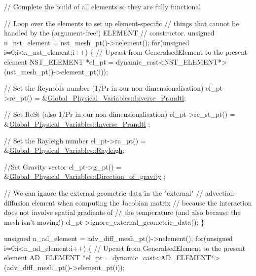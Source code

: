 \begin{DoxyCodeInclude}
 \textcolor{comment}{// Complete the build of all elements so they are fully functional }

 \textcolor{comment}{// Loop over the elements to set up element-specific }
 \textcolor{comment}{// things that cannot be handled by the (argument-free!) ELEMENT }
 \textcolor{comment}{// constructor.}
 \textcolor{keywordtype}{unsigned} n\_nst\_element = nst\_mesh\_pt()->nelement();
 \textcolor{keywordflow}{for}(\textcolor{keywordtype}{unsigned} i=0;i<n\_nst\_element;i++)
  \{
   \textcolor{comment}{// Upcast from GeneralsedElement to the present element}
   NST\_ELEMENT *el\_pt = \textcolor{keyword}{dynamic\_cast<}NST\_ELEMENT*\textcolor{keyword}{>}
    (nst\_mesh\_pt()->element\_pt(i));

   \textcolor{comment}{// Set the Reynolds number (1/Pr in our non-dimensionalisation)}
   el\_pt->re\_pt() = &\hyperlink{namespaceGlobal__Physical__Variables_a87796c9f402e6f90c07cf5ba0db4367e}{Global\_Physical\_Variables::Inverse\_Prandtl};

   \textcolor{comment}{// Set ReSt (also 1/Pr in our non-dimensionalisation)}
   el\_pt->re\_st\_pt() = &\hyperlink{namespaceGlobal__Physical__Variables_a87796c9f402e6f90c07cf5ba0db4367e}{Global\_Physical\_Variables::Inverse\_Prandtl}
      ;

   \textcolor{comment}{// Set the Rayleigh number}
   el\_pt->ra\_pt() = &\hyperlink{namespaceGlobal__Physical__Variables_a637fd2a6a7c5b34ed3288300d8bf84b7}{Global\_Physical\_Variables::Rayleigh};

   \textcolor{comment}{//Set Gravity vector}
   el\_pt->g\_pt() = &\hyperlink{namespaceGlobal__Physical__Variables_a42f4a0aee37dbb36186267931c614053}{Global\_Physical\_Variables::Direction\_of\_gravity}
      ;

   \textcolor{comment}{// We can ignore the external geometric data in the "external"}
   \textcolor{comment}{// advection diffusion element when computing the Jacobian matrix}
   \textcolor{comment}{// because the interaction does not involve spatial gradients of }
   \textcolor{comment}{// the temperature (and also because the mesh isn't moving!)}
   el\_pt->ignore\_external\_geometric\_data();
  \}

 \textcolor{keywordtype}{unsigned} n\_ad\_element = adv\_diff\_mesh\_pt()->nelement();
 \textcolor{keywordflow}{for}(\textcolor{keywordtype}{unsigned} i=0;i<n\_ad\_element;i++)
  \{
   \textcolor{comment}{// Upcast from GeneralsedElement to the present element}
   AD\_ELEMENT *el\_pt = \textcolor{keyword}{dynamic\_cast<}AD\_ELEMENT*\textcolor{keyword}{>}
    (adv\_diff\_mesh\_pt()->element\_pt(i));


\end{DoxyCodeInclude}
